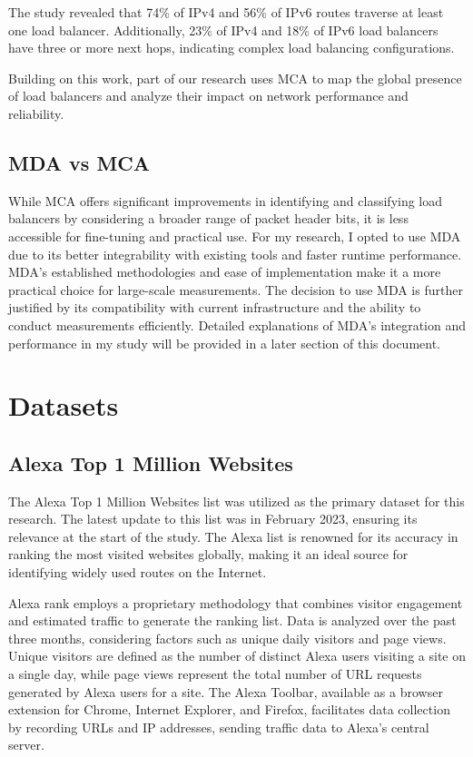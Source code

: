 \documentclass[12pt]{cwru_thesis}
\begin{document}
The study revealed that 74\% of IPv4 and 56\% of IPv6 routes traverse at least one load balancer. Additionally, 23\% of IPv4 and 18\% of IPv6 load balancers have three or more next hops, indicating complex load balancing configurations.

Building on this work, part of our research uses MCA to map the global presence of load balancers and analyze their impact on network performance and reliability. 

\section{MDA vs MCA}
While MCA offers significant improvements in identifying and classifying load balancers by considering a broader range of packet header bits, it is less accessible for fine-tuning and practical use. For my research, I opted to use MDA due to its better integrability with existing tools and faster runtime performance. MDA's established methodologies and ease of implementation make it a more practical choice for large-scale measurements. The decision to use MDA is further justified by its compatibility with current infrastructure and the ability to conduct measurements efficiently. Detailed explanations of MDA's integration and performance in my study will be provided in a later section of this document.



\chapter{Datasets}
\section{Alexa Top 1 Million Websites}

The Alexa Top 1 Million Websites list was utilized as the primary dataset for this research. The latest update to this list was in February 2023, ensuring its relevance at the start of the study. The Alexa list is renowned for its accuracy in ranking the most visited websites globally, making it an ideal source for identifying widely used routes on the Internet.

Alexa rank employs a proprietary methodology that combines visitor engagement and estimated traffic to generate the ranking list. Data is analyzed over the past three months, considering factors such as unique daily visitors and page views. Unique visitors are defined as the number of distinct Alexa users visiting a site on a single day, while page views represent the total number of URL requests generated by Alexa users for a site. The Alexa Toolbar, available as a browser extension for Chrome, Internet Explorer, and Firefox, facilitates data collection by recording URLs and IP addresses, sending traffic data to Alexa's central server.
\end{document}
